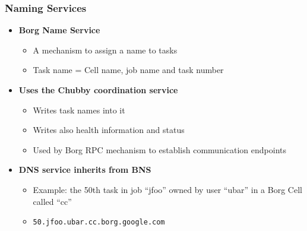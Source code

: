 \begin{frame}
\frametitle{Naming Services}
\begin{itemize}
	\item {\bf Borg Name Service}
	\begin{itemize}
		\item A mechanism to assign a name to tasks
		\item Task name = Cell name, job name and task number
	\end{itemize}

\vspace{20pt}

	\item {\bf Uses the Chubby coordination service}
	\begin{itemize}
		\item Writes task names into it
		\item Writes also health information and status
		\item Used by Borg RPC mechanism to establish communication endpoints
	\end{itemize}

\vspace{20pt}

	\item {\bf DNS service inherits from BNS}
	\begin{itemize}
		\item Example: the 50th task in job ``jfoo'' owned by user ``ubar'' in a Borg Cell called ``cc''
		\item \texttt{50.jfoo.ubar.cc.borg.google.com}
	\end{itemize}
\end{itemize}
\end{frame}

